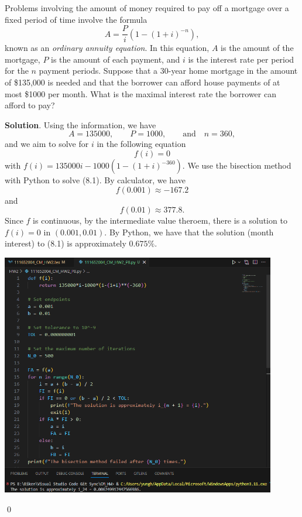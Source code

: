 \documentclass[11pt]{article}
\theoremstyle{break}
\numberwithin{equation}{theorem}
\begin{document}
\newpage
\begin{problem}\label{problem 8}
    Problems involving the amount of money required to pay off a mortgage over a fixed period of time involve the formula
    \begin{equation*}
        A=\dfrac{P}{i}\left(1-(1+i)^{-n}\right),
    \end{equation*}
    known as an \emph{ordinary annuity equation}. In this equation, $A$ is the amount of the mortgage, $P$ is the amount of each payment, and $i$ is the interest rate per period for the $n$ payment periods. Suppose that a 30-year home mortgage in the amount of \$135,000 is needed and that the borrower can afford house payments of at most \$1000 per month. What is the maximal interest rate the borrower can afford to pay?
\end{problem}
\textbf{Solution}. Using the information, we have 
\begin{equation*}
    A=135000, \qquad P=1000, \qquad \text{and}\quad n=360,
\end{equation*}
and we aim to solve for $i$ in the following equation
\begin{equation}
    f(i)=0
\end{equation}
with $f(i)=135000i-1000\left(1-(1+i)^{-360}\right)$. We use the bisection method with Python to solve (8.1). By calculator, we have 
\begin{equation*}
    f(0.001)\approx-167.2
\end{equation*}
and
\begin{equation*}
    f(0.01)\approx377.8.
\end{equation*}
Since $f$ is continuous, by the intermediate value theroem, there is a solution to $f(i)=0$ in $(0.001, 0.01)$. By Python, we have that the solution (month interest) to (8.1) is approximately $0.675\%$.
\begin{center}
    \includegraphics[width=0.9\textwidth]{problem_8_py.png}
\end{center}
\qed
\end{document}
